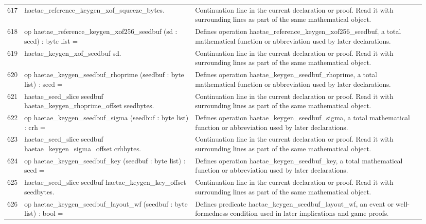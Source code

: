 \documentclass[10pt]{article}
\begin{document}
\begin{longtable}{r L{0.53\textwidth} L{0.37\textwidth}}
617 & {\ttfamily\scriptsize     haetae\_reference\_keygen\_xof\_squeeze\_bytes.} & Continuation line in the current declaration or proof.  Read it with surrounding lines as part of the same mathematical object. \\
618 & {\ttfamily\scriptsize op haetae\_reference\_keygen\_xof256\_seedbuf (sd : seed) : byte list =} & Defines operation haetae\_reference\_keygen\_xof256\_seedbuf, a total mathematical function or abbreviation used by later declarations. \\
619 & {\ttfamily\scriptsize   haetae\_keygen\_xof\_seedbuf sd.} & Continuation line in the current declaration or proof.  Read it with surrounding lines as part of the same mathematical object. \\
620 & {\ttfamily\scriptsize op haetae\_keygen\_seedbuf\_rhoprime (seedbuf : byte list) : seed =} & Defines operation haetae\_keygen\_seedbuf\_rhoprime, a total mathematical function or abbreviation used by later declarations. \\
621 & {\ttfamily\scriptsize   haetae\_seed\_slice seedbuf haetae\_keygen\_rhoprime\_offset seedbytes.} & Continuation line in the current declaration or proof.  Read it with surrounding lines as part of the same mathematical object. \\
622 & {\ttfamily\scriptsize op haetae\_keygen\_seedbuf\_sigma (seedbuf : byte list) : crh =} & Defines operation haetae\_keygen\_seedbuf\_sigma, a total mathematical function or abbreviation used by later declarations. \\
623 & {\ttfamily\scriptsize   haetae\_seed\_slice seedbuf haetae\_keygen\_sigma\_offset crhbytes.} & Continuation line in the current declaration or proof.  Read it with surrounding lines as part of the same mathematical object. \\
624 & {\ttfamily\scriptsize op haetae\_keygen\_seedbuf\_key (seedbuf : byte list) : seed =} & Defines operation haetae\_keygen\_seedbuf\_key, a total mathematical function or abbreviation used by later declarations. \\
625 & {\ttfamily\scriptsize   haetae\_seed\_slice seedbuf haetae\_keygen\_key\_offset seedbytes.} & Continuation line in the current declaration or proof.  Read it with surrounding lines as part of the same mathematical object. \\
626 & {\ttfamily\scriptsize op haetae\_keygen\_seedbuf\_layout\_wf (seedbuf : byte list) : bool =} & Defines predicate haetae\_keygen\_seedbuf\_layout\_wf, an event or well-formedness condition used in later implications and game proofs. \\

\end{longtable}
\end{document}
